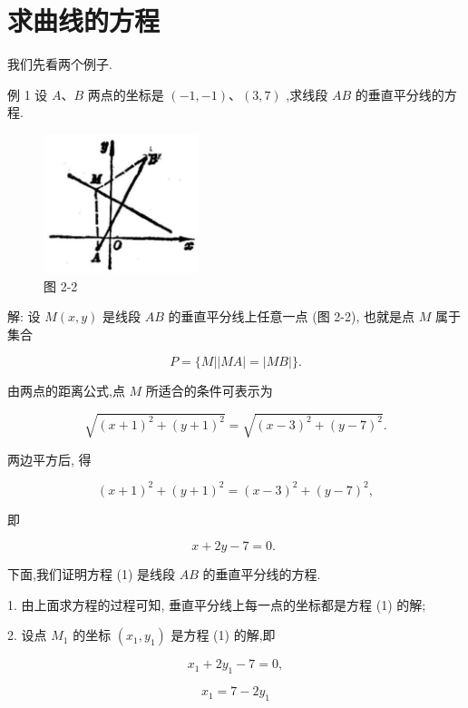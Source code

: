 \documentclass[lang=cn,newtx,10pt,scheme=chinese]{elegantbook}
\begin{document}
\section{求曲线的方程}

我们先看两个例子.

例 1 设 \(A\text{、}B\) 两点的坐标是 \(\left( {-1, - 1}\right) \text{、}\left( {3,7}\right)\) ,求线段 \({AB}\) 的垂直平分线的方程.

\begin{figure}[h]
  \centering
  \includegraphics[max width=0.4\textwidth]{images/01912cc2-ffb6-728e-9ae7-b113ff05c64b_67_837628.jpg}
  \caption{图 2-2}
\end{figure}



解: 设 \(M\left( {x,y}\right)\) 是线段 \({AB}\) 的垂直平分线上任意一点 (图 2-2), 也就是点 \(M\) 属于集合

\[
  P = \{ M\left| \right| {MA}\left| = \right| {MB} \mid \} .
\]

由两点的距离公式,点 \(M\) 所适合的条件可表示为

\[
  \sqrt{{\left( x + 1\right) }^{2} + {\left( y + 1\right) }^{2}} = \sqrt{{\left( x - 3\right) }^{2} + {\left( y - 7\right) }^{2}}.
\]

两边平方后, 得

\[
    {\left( x + 1\right) }^{2} + {\left( y + 1\right) }^{2} = {\left( x - 3\right) }^{2} + {\left( y - 7\right) }^{2},
\]

即

\[
  x + {2y} - 7 = 0\text{. } \tag{1}
\]

下面,我们证明方程 (1) 是线段 \({AB}\) 的垂直平分线的方程.

1. 由上面求方程的过程可知, 垂直平分线上每一点的坐标都是方程 (1) 的解;

2. 设点 \({M}_{1}\) 的坐标 \(\left( {{x}_{1},{y}_{1}}\right)\) 是方程 (1) 的解,即

\[
    {x}_{1} + 2{y}_{1} - 7 = 0,
\]

\[
    {x}_{1} = 7 - 2{y}_{1}
\]
\end{document}
